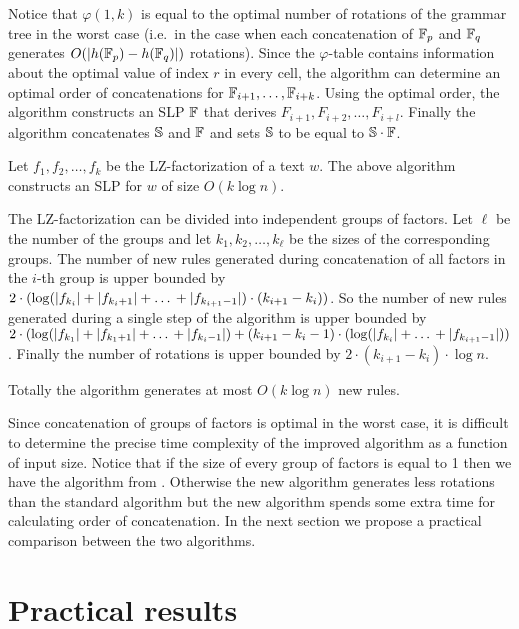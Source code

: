 \documentclass[10pt]{article}
\begin{document}
Notice that $\varphi(1, k)$ is equal to the optimal number of rotations of the grammar tree in the worst case (i.e.\ in
the case when each concatenation of $\mathbb{F}_p$ and $\mathbb{F}_q$ generates $O(|h(\mathbb{F}_p) - h(\mathbb{F}_q)|)$ rotations).
Since the $\varphi$-table contains information about the optimal value of index $r$ in every cell, the algorithm can
determine an optimal order of concatenations for $\mathbb{F}_{i+1}, \dots, \mathbb{F}_{i+k}$. Using the optimal order, the
algorithm constructs an SLP $\mathbb{F}$ that derives $F_{i+1}, F_{i+2}, \dots, F_{i+l}$. Finally the algorithm
concatenates $\mathbb{S}$ and $\mathbb{F}$ and sets $\mathbb{S}$ to be equal to $\mathbb{S} \cdot \mathbb{F}$.

\begin{thm}
Let $f_1, f_2, \dots, f_k$ be the LZ-factorization of a text $w$. The above algorithm constructs an SLP for $w$ of size
$O(k\log n)$.
\end{thm}
\proof{} The LZ-factorization can be divided into independent groups of factors. Let $\ell$ be the number of the groups
and let $k_1, k_2, \dots, k_\ell$ be the sizes of the corresponding groups. The number of new rules generated during
concatenation of all factors in the $i$-th group is upper bounded by $2\cdot(\log (|f_{k_i}| + |f_{k_i + 1}| +
\mbox{\dots}  + |f_{k_{i+1}-1}|) \cdot (k_{i+1} - k_i))$. So the number of new rules generated during a single step of
the algorithm is upper bounded by $2\cdot(\log(|f_{k_1}| + |f_{k_1 + 1}| + \mbox{\dots} + |f_{k_i -1}|) + (k_{i+1} - k_i
- 1) \cdot (\log (|f_{k_i}| + \mbox{\dots} + |f_{k_{i+1}-1}|))$. Finally the number of rotations is upper bounded by
$2\cdot(k_{i+1} - k_i) \cdot \log n$.

Totally the algorithm generates at most $O(k\log n)$ new rules.

Since concatenation of groups of factors is optimal in the worst case, it is difficult to determine the precise time
complexity of the improved algorithm as a function of input size. Notice that if the size of every group of factors is
equal to 1 then we have the algorithm from \cite{SLPConstruction}. Otherwise the new algorithm generates less rotations
than the standard algorithm but the new algorithm spends some extra time for calculating order of concatenation. In
the next section we propose a practical comparison between the two algorithms.

\section{Practical results}
\end{document}
